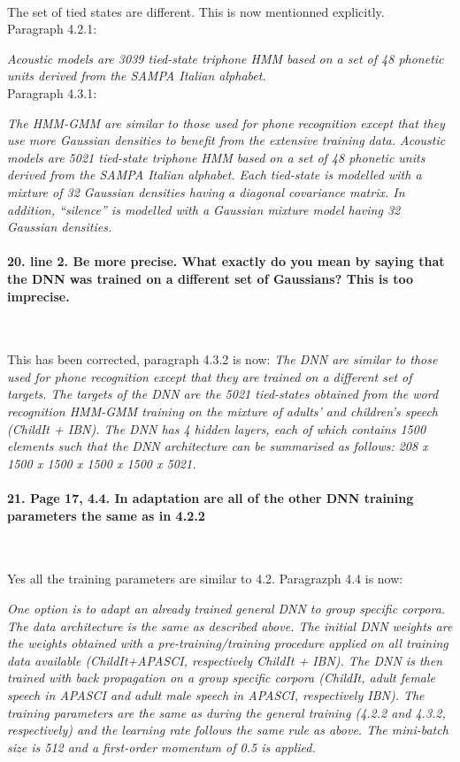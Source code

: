 \documentclass[]{article}
\begin{document}
~

The set of tied states are different. This is now mentionned explicitly.\\
Paragraph 4.2.1:

\textit{Acoustic models  are 3039 tied-state triphone HMM based on a set of 48 phonetic units derived from the SAMPA Italian alphabet.}
\\
Paragraph 4.3.1:

\textit{The HMM-GMM are similar to those used for phone recognition except that they use more Gaussian densities to benefit from the extensive training data. Acoustic models  are 5021 tied-state triphone HMM based on a set of  48 phonetic units  derived from the  SAMPA Italian alphabet. Each tied-state is modelled with  a mixture of  32 Gaussian densities   having  a  diagonal   covariance  matrix. In  addition, ``silence''  is  modelled  with  a  Gaussian mixture  model  having  32 Gaussian densities.}
\paragraph{20. line 2. Be more precise. What exactly do you mean by saying that the DNN was trained on a different set of Gaussians? This is too imprecise.}

~

This has been corrected, paragraph 4.3.2 is now:
\textit{The DNN  are similar to those  used for phone  recognition except that they are  trained on a different  set of targets. The  targets of the DNN are the 5021 tied-states obtained from the word recognition HMM-GMM training on the mixture of adults' and children's  speech (ChildIt + IBN). The DNN has 4 hidden  layers, each of which  contains 1500 elements  such that the DNN architecture  can be summarised  as follows: 208  x 1500 x  1500 x 1500 x 1500 x 5021.}

\paragraph{21. Page 17, 4.4. In adaptation are all of the other DNN training parameters the same as in 4.2.2}

~

Yes all the training parameters are similar to 4.2. Paragrazph 4.4 is now:

\textit{One option is to adapt an already trained general DNN  to group specific corpora. The data architecture is the same as described above. The initial DNN weights are the weights obtained with a pre-training/training procedure applied on all training data available  (ChildIt+APASCI, respectively ChildIt + IBN). The DNN is then trained with back propagation on a group specific corpora (ChildIt, adult female speech in APASCI and adult male speech in APASCI, respectively IBN). The training parameters are the same as during the general training (4.2.2 and 4.3.2, respectively) and the learning rate follows the same rule as above. The mini-batch size is 512 and a first-order momentum of 0.5 is applied.}
\end{document}
